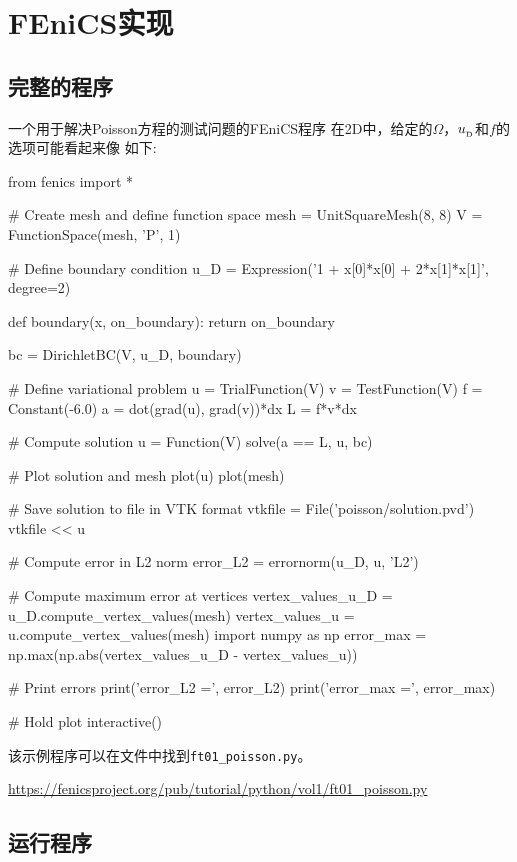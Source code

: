 \section{FEniCS实现}
\label{ch:poisson0:impl}

\subsection{完整的程序}
一个用于解决Poisson方程的测试问题的FEniCS程序
在2D中，给定的$\Omega$，$\ub$和$f$的选项可能看起来像
如下:

\begin{python}
from fenics import *

# Create mesh and define function space
mesh = UnitSquareMesh(8, 8)
V = FunctionSpace(mesh, 'P', 1)

# Define boundary condition
u_D = Expression('1 + x[0]*x[0] + 2*x[1]*x[1]', degree=2)

def boundary(x, on_boundary):
    return on_boundary

bc = DirichletBC(V, u_D, boundary)

# Define variational problem
u = TrialFunction(V)
v = TestFunction(V)
f = Constant(-6.0)
a = dot(grad(u), grad(v))*dx
L = f*v*dx

# Compute solution
u = Function(V)
solve(a == L, u, bc)

# Plot solution and mesh
plot(u)
plot(mesh)

# Save solution to file in VTK format
vtkfile = File('poisson/solution.pvd')
vtkfile << u

# Compute error in L2 norm
error_L2 = errornorm(u_D, u, 'L2')

# Compute maximum error at vertices
vertex_values_u_D = u_D.compute_vertex_values(mesh)
vertex_values_u = u.compute_vertex_values(mesh)
import numpy as np
error_max = np.max(np.abs(vertex_values_u_D - vertex_values_u))

# Print errors
print('error_L2  =', error_L2)
print('error_max =', error_max)

# Hold plot
interactive()
\end{python}

该示例程序可以在文件中找到{\nolinkurl{ft01_poisson.py}}。
\begin{center}
  \url{https://fenicsproject.org/pub/tutorial/python/vol1/ft01_poisson.py}
\end{center}


\subsection{运行程序}
\label{ch:poisson0:impl:run}

